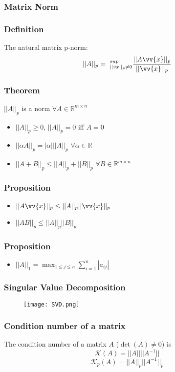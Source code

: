 \documentclass[11pt]{article}
\newcommand{\R}{{\mathbb{R}}}
\newcommand{\vx}{\vv{x}}
\newcommand{\ds}{\displaystyle}
\begin{document}
\subsubsection{Matrix Norm}
\subsubsection*{Definition}
The natural matrix p-norm: \[||A||_p = \ ^{sup}_{||vx||_p\neq0}\frac{||A\vx||_p}{||\vx||_p}\]
\subsubsection*{Theorem}
$||A||_p$ is a norm $\forall A\in\R^{m\times n}$
\begin{itemize}
  \item $||A||_p\geq0$, $||A||_p=0$ iff $A=0$
  \item $||\alpha A||_p = |\alpha|||A||_p$ $\forall\alpha\in\R$
  \item $||A+B||_p\leq ||A||_p + ||B||_p$ $\forall B\in\R^{m\times n}$
\end{itemize}
\subsubsection*{Proposition}
\begin{itemize}
  \item $||A\vx||_p\leq ||A||_p||\vx||_p$
  \item $||AB||_p\leq ||A||_p||B||_p$
\end{itemize}
\subsubsection*{Proposition}
\begin{itemize}
  \item $||A||_1 = \ds\max_{1\leq j\leq n}\sum_{i=1}^{n}|a_{ij}|$
\end{itemize}
\subsubsection*{Singular Value Decomposition}
\begin{figure}[tbhp]
	\begin{center}
		\texttt{[image: SVD.png]}
	\end{center}
	\label{figcaption}
\end{figure}
\newpage 
\subsubsection{Condition number of a matrix}
The condition number of a matrix $A$ ($\det(A)\neq0$) is 
\[\mathcal{K}(A) = ||A||||A^{-1}||\]
\[\mathcal{K}_p(A) = ||A||_p||A^{-1}||_p\]
\end{document}
